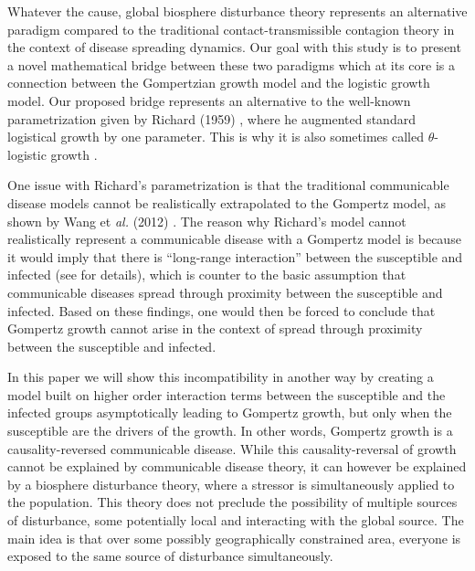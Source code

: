 \documentclass{article}
\begin{document}
Whatever the cause, global biosphere disturbance theory represents an alternative paradigm compared to the traditional contact-transmissible contagion theory in the context of disease spreading dynamics. Our goal with this study is to present a novel mathematical bridge between these two paradigms which at its core is a connection between the Gompertzian growth model and the logistic growth model. Our proposed bridge represents an alternative to the well-known parametrization given by Richard (1959) \cite{richards1959flexible}, where he augmented standard logistical growth by one parameter. This is why it is also sometimes called $\theta$-logistic growth \cite{petroni2020logistic}.

 One issue with Richard's parametrization is that the traditional communicable disease models cannot be realistically extrapolated to the Gompertz model, as shown by Wang et \textit{al.} (2012) \cite{wang2012richards}. The reason why Richard's model cannot realistically represent a communicable disease with a Gompertz model is because it would imply that there is ``long-range interaction'' between the susceptible and infected (see \cite{petroni2020logistic} for details), which is counter to the basic assumption that communicable diseases spread through proximity between the susceptible and infected. Based on these findings, one would then be forced to conclude that Gompertz growth cannot arise in the context of spread through proximity between the susceptible and infected.

In this paper we will show this incompatibility in another way by creating a model built on higher order interaction terms between the susceptible and the infected groups asymptotically leading to Gompertz growth, but only when the susceptible are the drivers of the growth. In other words, Gompertz growth is a causality-reversed communicable disease. While this causality-reversal of growth cannot be explained by communicable disease theory, it can however be explained by a biosphere disturbance theory, where a stressor is simultaneously applied to the population. This theory does not preclude the possibility of multiple sources of disturbance, some potentially local and interacting with the global source. The main idea is that over some possibly geographically constrained area, everyone is exposed to the same source of disturbance simultaneously.
\end{document}
